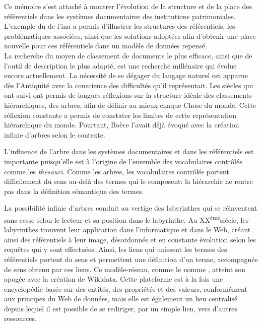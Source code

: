 
Ce mémoire s'est attaché à montrer l'évolution de la structure et de la place des référentiels dans les systèmes documentaires des institutions patrimoniales. L'exemple du \ldd de l'\ac*{ina} a permis d'illustrer les structures des référentiels, les problématiques associées, ainsi que les solutions adoptées afin d'obtenir une place nouvelle pour ces référentiels dans un modèle de données repensé.\\

La recherche du moyen de classement de documents le plus efficace, ainsi que de l'outil de description le plus adapté, est une recherche millénaire qui évolue encore actuellement. La nécessité de se dégager du langage naturel est apparue dès l'Antiquité avec la conscience des difficultés qu'il représentait. Les siècles qui ont suivi ont permis de longues réflexions sur la structure idéale des classements hiérarchiques, des arbres, afin de définir au mieux chaque Chose du monde. Cette réflexion constante a permis de constater les limites de cette représentation hiérarchique du monde. Pourtant, Boèce l'avait déjà évoqué avec la création infinie d'arbres selon le contexte.

\noindent L'influence de l'arbre dans les systèmes documentaires et dans les référentiels est importante puisqu'elle est à l'origine de l'ensemble des vocabulaires contrôlés comme les \textit{thesauri}. Comme les arbres, les vocabulaires contrôlés portent difficilement du sens au-delà des termes qui le composent: la hiérarchie ne rentre pas dans la définition sémantique des termes.

\noindent La possibilité infinie d'arbres conduit au vertige des labyrinthes qui se réinventent sans cesse selon le lecteur et sa position dans le labyrinthe. Au \textsc{XX}\textsuperscript{ème}siècle, les labyrinthes trouvent leur application dans l'informatique et dans le Web, créant ainsi des référentiels à leur image, désordonnés et en constante évolution selon les requêtes qui y sont effectuées. Ainsi, les liens qui unissent les termes des référentiels portent du sens et permettent une définition d'un terme, accompagnée de sens obtenu par ces liens. Ce \og modèle-réseau\fg{}, comme le nomme , atteint son apogée avec la création de Wikidata. Cette plateforme est à la fois une encyclopédie basée sur des entités, des propriétés et des valeurs, conformément aux principes du Web de données, mais elle est également un lieu centralisé depuis lequel il est possible de se rediriger, par un simple lien, vers d'autres ressources.

